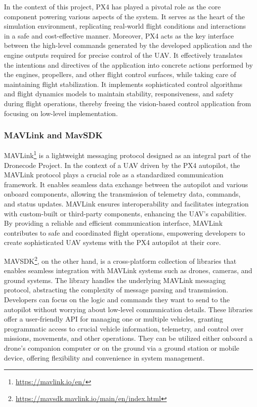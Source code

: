 In the context of this project, PX4 has played a pivotal role as the core component powering various aspects of the system. It serves as the heart of the simulation environment, replicating real-world flight conditions and interactions in a safe and cost-effective manner.
Moreover, PX4 acts as the key interface between the high-level commands generated by the developed application and the engine outputs required for precise control of the UAV. It effectively translates the intentions and directives of the application into concrete actions performed by the engines, propellers, and other flight control surfaces, while taking care of maintaining flight stabilization.
It implements sophisticated control algorithms and flight dynamics models to maintain stability, responsiveness, and safety during flight operations, thereby freeing the vision-based control application from focusing on low-level implementation.


\subsubsection{MAVLink and MavSDK}
\label{subsec:mavlink}

MAVLink\footnote{\url{https://mavlink.io/en/}} is a lightweight messaging protocol designed as an integral part of the Dronecode Project.
In the context of a UAV driven by the PX4 autopilot, the MAVLink protocol plays a crucial role as a standardized communication framework. It enables seamless data exchange between the autopilot and various onboard components, allowing the transmission of telemetry data, commands, and status updates. MAVLink ensures interoperability and facilitates integration with custom-built or third-party components, enhancing the UAV's capabilities. By providing a reliable and efficient communication interface, MAVLink contributes to safe and coordinated flight operations, empowering developers to create sophisticated UAV systems with the PX4 autopilot at their core.

MAVSDK\footnote{\url{https://mavsdk.mavlink.io/main/en/index.html}}, on the other hand, is a cross-platform collection of libraries that enables seamless integration with MAVLink systems such as drones, cameras, and ground systems.
The library handles the underlying MAVLink messaging protocol, abstracting the complexity of message parsing and transmission. Developers can focus on the logic and commands they want to send to the autopilot without worrying about low-level communication details.
These libraries offer a user-friendly API for managing one or multiple vehicles, granting programmatic access to crucial vehicle information, telemetry, and control over missions, movements, and other operations. They can be utilized either onboard a drone's companion computer or on the ground via a ground station or mobile device, offering flexibility and convenience in system management.

